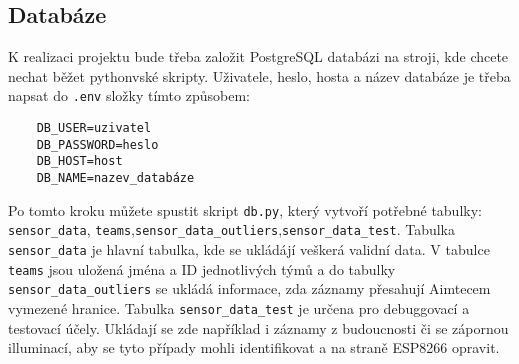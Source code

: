 \subsection{Databáze}
\label{ssec:db}
K realizaci projektu bude třeba založit PostgreSQL databázi na stroji, kde chcete nechat běžet pythonvské skripty. Uživatele, heslo, hosta a název databáze je třeba napsat do \verb|.env| složky tímto způsobem:
\begin{verbatim}
    DB_USER=uzivatel
    DB_PASSWORD=heslo
    DB_HOST=host
    DB_NAME=nazev_databáze
\end{verbatim}
Po tomto kroku můžete spustit skript \verb|db.py|, který vytvoří potřebné tabulky: \verb|sensor_data|, \verb|teams|,\verb|sensor_data_outliers|,\verb|sensor_data_test|.
Tabulka \verb|sensor_data| je hlavní tabulka, kde se ukládájí veškerá validní data. V tabulce \verb|teams| jsou uložená jména a ID jednotlivých týmů a do tabulky \verb|sensor_data_outliers| se ukládá informace, zda záznamy přesahují Aimtecem vymezené hranice.
Tabulka \verb|sensor_data_test| je určena pro debuggovací a testovací účely. Ukládají se zde například i záznamy z budoucnosti či se zápornou illuminací, aby se tyto případy mohli identifikovat a na straně ESP8266 opravit. 